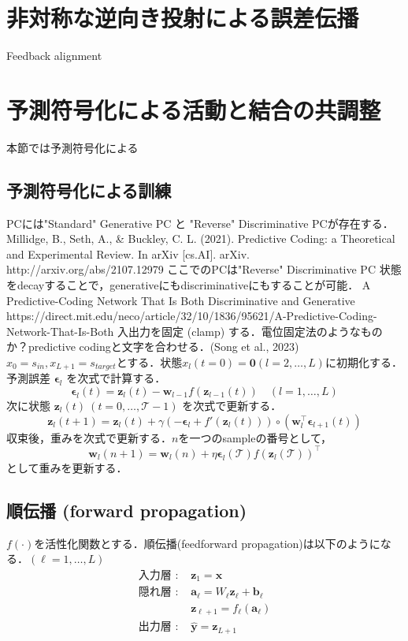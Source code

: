 \section{非対称な逆向き投射による誤差伝播}
Feedback alignment
\section{予測符号化による活動と結合の共調整}
本節では予測符号化による
\subsection{予測符号化による訓練}
PCには"Standard" Generative PC と "Reverse" Discriminative PCが存在する．
Millidge, B., Seth, A., & Buckley, C. L. (2021). Predictive Coding: a Theoretical and Experimental Review. In arXiv [cs.AI]. arXiv. http://arxiv.org/abs/2107.12979
ここでのPCは"Reverse" Discriminative PC
状態をdecayすることで，generativeにもdiscriminativeにもすることが可能．
A Predictive-Coding Network That Is Both Discriminative and Generative
https://direct.mit.edu/neco/article/32/10/1836/95621/A-Predictive-Coding-Network-That-Is-Both
入出力を固定 (clamp) する．電位固定法のようなものか？predictive codingと文字を合わせる．(Song et al., 2023)
$x_0=s_{in}, x_{L+1}=s_{target}$とする．状態$x_l(t=0)=\mathbf{0} (l=2, \ldots, L)$に初期化する．予測誤差 $\mathbf{\epsilon}_l$ を次式で計算する．
\begin{equation}
\mathbf{\epsilon}_l(t)=\mathbf{z}_l(t)-\mathbf{w}_{l-1}f(\mathbf{z}_{l-1}(t))\quad(l=1, \ldots, L)
\end{equation}
次に状態 $\mathbf{z}_l(t)\ (t=0, \ldots, \mathcal{T}-1)$ を次式で更新する．
\begin{equation}
\mathbf{z}_l(t+1)=\mathbf{z}_l(t)+\gamma (-\mathbf{\epsilon}_l + f'(\mathbf{z}_l(t))) \circ (\mathbf{w}_l^\top \mathbf{\epsilon}_{l+1}(t))
\end{equation}
収束後，重みを次式で更新する．$n$を一つのsampleの番号として，
\begin{equation}
\mathbf{w}_l(n+1)=\mathbf{w}_l(n)+\eta \mathbf{\epsilon}_l(\mathcal{T}) f(\mathbf{z}_l(\mathcal{T}))^\top
\end{equation}
として重みを更新する．
\subsection{順伝播 (forward propagation)}
$f(\cdot)$を活性化関数とする．順伝播(feedforward propagation)は以下のようになる．$(\ell=1,\ldots,L)$
\begin{align}
\text{入力層 : }&\mathbf{z}_1=\mathbf{x}\\
\text{隠れ層 : }&\mathbf{a}_\ell=W_\ell \mathbf{z}_\ell +\mathbf{b}_\ell\\
&\mathbf{z}_{\ell+1}=f_\ell\left(\mathbf{a}_\ell\right)\\
\text{出力層 : }&\hat{\mathbf{y}}=\mathbf{z}_{L+1}
\end{align}
